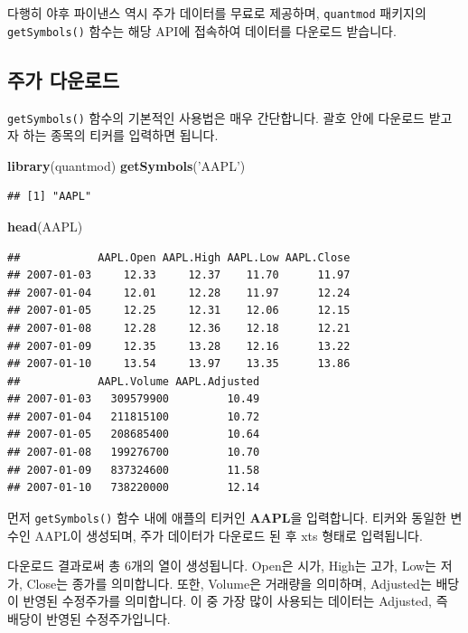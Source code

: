 \documentclass[12pt,]{book}
\newenvironment{Shaded}{\begin{snugshade}}{\end{snugshade}}
\newcommand{\KeywordTok}[1]{\textcolor[rgb]{0.13,0.29,0.53}{\textbf{#1}}}
\newcommand{\NormalTok}[1]{#1}
\newcommand{\StringTok}[1]{\textcolor[rgb]{0.31,0.60,0.02}{#1}}
\begin{document}
다행히 야후 파이낸스 역시 주가 데이터를 무료로 제공하며, \texttt{quantmod} 패키지의 \texttt{getSymbols()} 함수는 해당 API에 접속하여 데이터를 다운로드 받습니다.

\hypertarget{section-10}{%
\subsection{주가 다운로드}\label{section-10}}

\texttt{getSymbols()} 함수의 기본적인 사용법은 매우 간단합니다. 괄호 안에 다운로드 받고자 하는 종목의 티커를 입력하면 됩니다.

\begin{Shaded}
\begin{Highlighting}[]
\KeywordTok{library}\NormalTok{(quantmod)}
\KeywordTok{getSymbols}\NormalTok{(}\StringTok{'AAPL'}\NormalTok{)}
\end{Highlighting}
\end{Shaded}

\begin{verbatim}
## [1] "AAPL"
\end{verbatim}

\begin{Shaded}
\begin{Highlighting}[]
\KeywordTok{head}\NormalTok{(AAPL)}
\end{Highlighting}
\end{Shaded}

\begin{verbatim}
##            AAPL.Open AAPL.High AAPL.Low AAPL.Close
## 2007-01-03     12.33     12.37    11.70      11.97
## 2007-01-04     12.01     12.28    11.97      12.24
## 2007-01-05     12.25     12.31    12.06      12.15
## 2007-01-08     12.28     12.36    12.18      12.21
## 2007-01-09     12.35     13.28    12.16      13.22
## 2007-01-10     13.54     13.97    13.35      13.86
##            AAPL.Volume AAPL.Adjusted
## 2007-01-03   309579900         10.49
## 2007-01-04   211815100         10.72
## 2007-01-05   208685400         10.64
## 2007-01-08   199276700         10.70
## 2007-01-09   837324600         11.58
## 2007-01-10   738220000         12.14
\end{verbatim}

먼저 \texttt{getSymbols()} 함수 내에 애플의 티커인 \textbf{AAPL}을 입력합니다. 티커와 동일한 변수인 AAPL이 생성되며, 주가 데이터가 다운로드 된 후 xts 형태로 입력됩니다.

다운로드 결과로써 총 6개의 열이 생성됩니다. Open은 시가, High는 고가, Low는 저가, Close는 종가를 의미합니다. 또한, Volume은 거래량을 의미하며, Adjusted는 배당이 반영된 수정주가를 의미합니다. 이 중 가장 많이 사용되는 데이터는 Adjusted, 즉 배당이 반영된 수정주가입니다.
\end{document}
